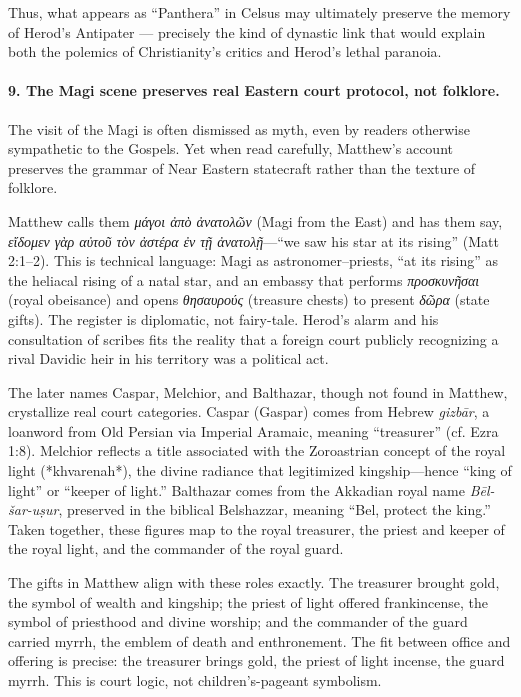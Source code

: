 Thus, what appears as “Panthera” in Celsus may ultimately preserve the memory of Herod’s Antipater — precisely the kind of dynastic link that would explain both the polemics of Christianity’s critics and Herod’s lethal paranoia.

\paragraph{9.
The Magi scene preserves real Eastern court protocol, not folklore.}\label{par:magi-court-protocol}

The visit of the Magi is often dismissed as myth, even by readers otherwise sympathetic to the Gospels.
Yet when read carefully, Matthew’s account preserves the grammar of Near Eastern statecraft rather than the texture of folklore.

Matthew calls them \textit{μάγοι ἀπὸ ἀνατολῶν} (Magi from the East) and has them say, \textit{εἴδομεν γὰρ αὐτοῦ τὸν ἀστέρα ἐν τῇ ἀνατολῇ}—“we saw his star at its rising” (Matt 2:1–2).
This is technical language: Magi as astronomer–priests, “at its rising” as the heliacal rising of a natal star, and an embassy that performs \textit{προσκυνῆσαι} (royal obeisance) and opens \textit{θησαυρούς} (treasure chests) to present \textit{δῶρα} (state gifts).
The register is diplomatic, not fairy-tale.
Herod’s alarm and his consultation of scribes fits the reality that a foreign court publicly recognizing a rival Davidic heir in his territory was a political act.

The later names Caspar, Melchior, and Balthazar, though not found in Matthew, crystallize real court categories.
Caspar (Gaspar) comes from Hebrew \textit{gizbār}, a loanword from Old Persian via Imperial Aramaic, meaning “treasurer” (cf. Ezra 1:8).
Melchior reflects a title associated with the Zoroastrian concept of the royal light (*khvarenah*), the divine radiance that legitimized kingship—hence “king of light” or “keeper of light.”
Balthazar comes from the Akkadian royal name \textit{Bēl-šar-uṣur}, preserved in the biblical Belshazzar, meaning “Bel, protect the king.”
Taken together, these figures map to the royal treasurer, the priest and keeper of the royal light, and the commander of the royal guard.

The gifts in Matthew align with these roles exactly.
The treasurer brought gold, the symbol of wealth and kingship; the priest of light offered frankincense, the symbol of priesthood and divine worship; and the commander of the guard carried myrrh, the emblem of death and enthronement.
The fit between office and offering is precise: the treasurer brings gold, the priest of light incense, the guard myrrh.
This is court logic, not children’s-pageant symbolism.

